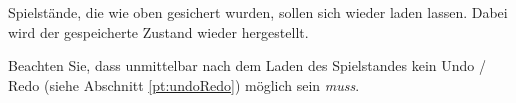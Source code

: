 Spielst\"ande, die wie oben gesichert wurden, sollen sich wieder laden
lassen. Dabei wird der gespeicherte Zustand wieder hergestellt.

Beachten Sie, dass unmittelbar nach dem Laden des Spielstandes kein
Undo / Redo (siehe Abschnitt \vref{pt:undoRedo}) m\"oglich sein \emph{muss}.
